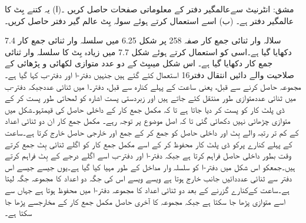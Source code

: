 مشق:	انٹرنیٹ سےعالمگیر دفتر کے معلوماتی صفحات حاصل کریں ۔(ا) یہ کتنے بِٹ کا عالمگیر دفتر ہے۔ (ب) اسے استعمال کرتے ہوئے سولہ بِٹ عالم گیر دفتر حاصل کریں۔
 
7.4 سلالہ وار ثنائی جمع کار
	صفہ 258 پر شکل 6.25 میں سلسلہ وار ثنائی جمع کار دکھایا گیا ہے۔اسی کو استعمال کرتے ہوئے شکل 7.7 میں زیادہ بِٹ کا سلسلہ وار ثنائی جمع کار دکھایا گیا ہے۔
	اس شکل میںبِٹ کے دو عدد متوازی لکھائی و پڑھائی کے صلاحیت والے دائیں انتقال  دفتر16 استعمال کئے گئے ہیں جنہیں دفتر-ا اور دفتر-ب کہا گیا ہے۔
	مجموعہ حاصل کرنے سے قبل، یعنی ساعت کے پہلے کنارہ سے قبل، دفتر۔ا میں ثنائی عددجبکہ دفتر-ب میں ثنائی عددمتوازی طور منتقل کئے جاتے ہیں اور زبردستی پست اشارہ کو لمحاتی طور پست کر کے ڈی پلٹ کار کو پست کر دیا جاتا ہے تا کہ مکمل جمع کار کے داخلی حاصل کی قیمتہو۔شکل میں متوازی چڑھائی نہیں دکھائی گئی تا کہ اصل موضوع پر توجہ رہے۔
	مکمل جمع کار ان دو ثنائی اعداد کے کم تر رتبہ والے بِٹ اور داخلی حاصل  کو جمع کر کے جمع  اور خارجی حاصل خارج کرتا ہے۔ساعت کے پہلے کنارے پرکو ڈی پلٹ کار محفوظ کر کے اسے مکمل جمع کار کو اگلے ثنائی بِٹ جمع کرتے وقت بطور داخلی حاصل فراہم کرتا ہے جبکہ دفتر-ا اور دفتر-ب اسے اگلے درجے کے بِٹ فراہم کرتے ہیں۔جمعکو اس شکل میں دفتر-ا کو سلسلہ وار مداخل کے طور مہیا کیا گیا ہے۔یوں جیسے جیسے اس دفتر سے ثنائی عدددائیں جانب خارج ہوتا ہے ویسے ویسے اس کی جگہ دو اعداد کا مجموعہ جگہ لیتا ہے۔ساعت کےکنارے گزرنے کے بعد دو ثنائی اعداد کا مجموعہ دفتر-ا میں محفوظ ہوتا ہے جہاں سے اسے متوازی پڑھا جا سکتا ہے جبکہ مجموعہ کا آخری حاصل مکمل جمع کار کے مخارجسے پڑھا جا سکتا ہے۔
